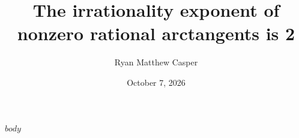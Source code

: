 \documentclass[11pt]{article}
\title{The irrationality exponent of nonzero rational arctangents is 2}
\author{Ryan Matthew Casper}
\date{October 7, 2026}
\begin{document}
\maketitle
$body$
\end{document}
